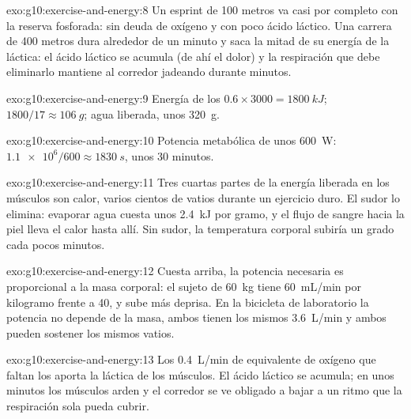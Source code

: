 \begin{solution}{exo:g10:exercise-and-energy:8}
Un esprint de 100 metros va casi por completo con la reserva fosforada:
sin deuda de oxígeno y con poco ácido láctico. Una carrera de 400
metros dura alrededor de un minuto y saca la mitad de su energía de la
 láctica: el ácido láctico se acumula (de ahí el dolor) y
la respiración que debe eliminarlo mantiene al corredor jadeando
durante minutos.
\end{solution}

\begin{solution}{exo:g10:exercise-and-energy:9}
Energía de los  $0.6 \times 3000 = \qty{1800}{kJ}$; 
$1800/17 \approx \qty{106}{g}$; agua liberada, unos \qty{320}{g}.
\end{solution}

\begin{solution}{exo:g10:exercise-and-energy:10}
Potencia metabólica de unos \qty{600}{W}: $\num{1.1e6}/600 \approx
\qty{1830}{s}$, unos 30 minutos.
\end{solution}

\begin{solution}{exo:g10:exercise-and-energy:11}
Tres cuartas partes de la energía liberada en los músculos son calor,
varios cientos de vatios durante un ejercicio duro. El sudor lo
elimina: evaporar agua cuesta unos \qty{2.4}{kJ} por gramo, y el flujo
de sangre hacia la piel lleva el calor hasta allí. Sin sudor, la
temperatura corporal subiría un grado cada pocos minutos.
\end{solution}

\begin{solution}{exo:g10:exercise-and-energy:12}
Cuesta arriba, la potencia necesaria es proporcional a la masa
corporal: el sujeto de \qty{60}{kg} tiene \qty{60}{mL/min} por
kilogramo frente a \num{40}, y sube más deprisa. En la bicicleta de
laboratorio la potencia no depende de la masa, ambos tienen los mismos
\qty{3.6}{L/min} y ambos pueden sostener los mismos vatios.
\end{solution}

\begin{solution}{exo:g10:exercise-and-energy:13}
Los \qty{0.4}{L/min} de equivalente de oxígeno que faltan los aporta la
 láctica de los músculos. El ácido láctico se acumula; en
unos minutos los músculos arden y el corredor se ve obligado a bajar a
un ritmo que la respiración sola pueda cubrir.
\end{solution}

